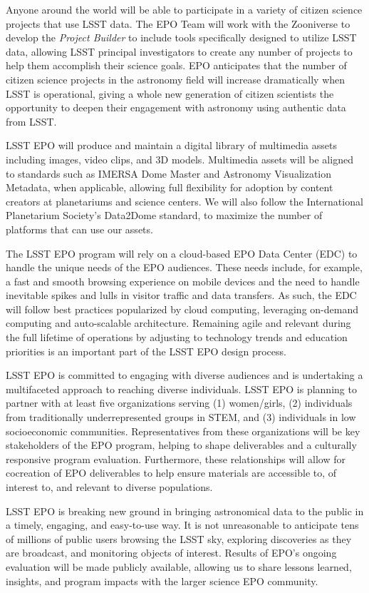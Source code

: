 Anyone around the world will be able to participate in a variety of citizen science projects that use LSST data.  The EPO Team will work with the Zooniverse to develop the \textit{Project Builder} to include tools specifically designed to utilize LSST data, allowing LSST principal investigators to create any number of projects to help them accomplish their science goals. EPO anticipates that the number of citizen science projects in the astronomy field will increase dramatically when LSST is operational, giving a whole new generation of citizen scientists the opportunity to deepen their engagement with astronomy using authentic data from LSST.

LSST EPO will produce and maintain a digital library of multimedia
assets including images, video clips, and 3D models.  Multimedia
assets will be aligned to standards such as IMERSA Dome Master and
Astronomy Visualization Metadata, when applicable, allowing full
flexibility for adoption by content creators at planetariums and
science centers. We will also follow the International Planetarium
Society's Data2Dome standard, to maximize the number of platforms that
can use our assets.

The LSST EPO program will rely on a cloud-based EPO Data Center (EDC) to handle the unique needs of the EPO audiences. These needs include, for example, a fast and smooth browsing experience on mobile devices and the need to handle inevitable spikes and lulls in visitor traffic and data transfers. As such, the EDC will follow best practices popularized by cloud computing, leveraging on-demand computing and auto-scalable architecture. Remaining agile and relevant during the full lifetime of operations by adjusting to technology trends and education priorities is an important part of the LSST EPO design process.

LSST EPO is committed to engaging with diverse audiences and is undertaking a multifaceted approach to reaching diverse individuals.  LSST EPO is planning to partner with at least five organizations serving (1) women/girls, (2) individuals from traditionally underrepresented groups in STEM, and (3) individuals in low socioeconomic communities. Representatives from these organizations will be key stakeholders of the EPO program, helping to shape deliverables and a culturally responsive program evaluation. Furthermore, these relationships will allow for cocreation of EPO deliverables to help ensure materials are accessible to, of interest to, and relevant to diverse populations.

LSST EPO is breaking new ground in bringing astronomical data to the public in a timely, engaging, and easy-to-use way. It is not unreasonable to anticipate tens of millions of public users browsing the LSST sky, exploring discoveries as they are broadcast, and monitoring objects of interest. Results of EPO's ongoing evaluation will be made publicly available, allowing us to share lessons learned, insights, and program impacts with the larger science EPO community.
